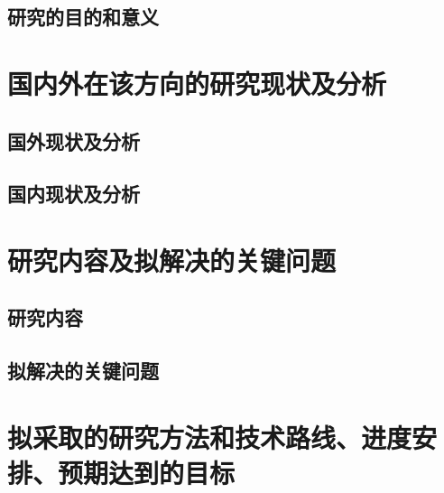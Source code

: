 \documentclass[fontset=windows,toc=true,type=bachelor,stage=opening,campus=weihai]{hithesisart}
\begin{document}
\subsection{研究的目的和意义}
\section{国内外在该方向的研究现状及分析}
\subsection{国外现状及分析}
\subsection{国内现状及分析}
\section{研究内容及拟解决的关键问题}
\subsection{研究内容}
\subsection{拟解决的关键问题}
\section{拟采取的研究方法和技术路线、进度安排、预期达到的目标}
\end{document}
